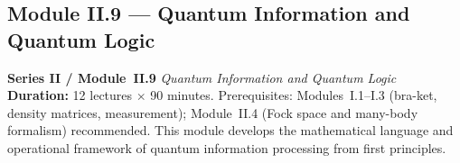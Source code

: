 \documentclass[11pt,a4paper]{article}
\begin{document}
\subsection{Module II.9 --- Quantum Information and Quantum Logic}
\label{sec:mod-II9}

\begin{tcolorbox}[seriesbox]
  \textbf{Series II / Module~II.9} \quad
  \textit{Quantum Information and Quantum Logic}\\[4pt]
  \textbf{Duration:} 12 lectures $\times$ 90 minutes.
  Prerequisites: Modules~I.1--I.3 (bra-ket, density matrices, measurement);
  Module~II.4 (Fock space and many-body formalism) recommended.
  This module develops the mathematical language and operational framework
  of quantum information processing from first principles.
\end{tcolorbox}

\medskip
\end{document}
